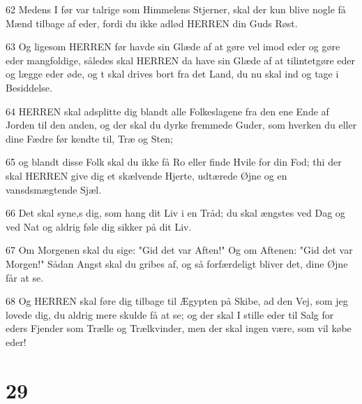 \par 62 Medens I før var talrige som Himmelens Stjerner, skal der kun blive nogle få Mænd tilbage af eder, fordi du ikke adlød HERREN din Guds Røst.
\par 63 Og ligesom HERREN før havde sin Glæde af at gøre vel imod eder og gøre eder mangfoldige, således skal HERREN da have sin Glæde af at tilintetgøre eder og lægge eder øde, og t skal drives bort fra det Land, du nu skal ind og tage i Besiddelse.
\par 64 HERREN skal adsplitte dig blandt alle Folkeslagene fra den ene Ende af Jorden til den anden, og der skal du dyrke fremmede Guder, som hverken du eller dine Fædre før kendte til, Træ og Sten;
\par 65 og blandt disse Folk skal du ikke få Ro eller finde Hvile for din Fod; thi der skal HERREN give dig et skælvende Hjerte, udtærede Øjne og en vansdsmægtende Sjæl.
\par 66 Det skal syne,s dig, som hang dit Liv i en Tråd; du skal ængstes ved Dag og ved Nat og aldrig føle dig sikker på dit Liv.
\par 67 Om Morgenen skal du sige: "Gid det var Aften!" Og om Aftenen: "Gid det var Morgen!" Sådan Angst skal du gribes af, og så forfærdeligt bliver det, dine Øjne får at se.
\par 68 Og HERREN skal føre dig tilbage til Ægypten på Skibe, ad den Vej, som jeg lovede dig, du aldrig mere skulde få at se; og der skal I stille eder til Salg for eders Fjender som Trælle og Trælkvinder, men der skal ingen være, som vil købe eder!

\chapter{29}

